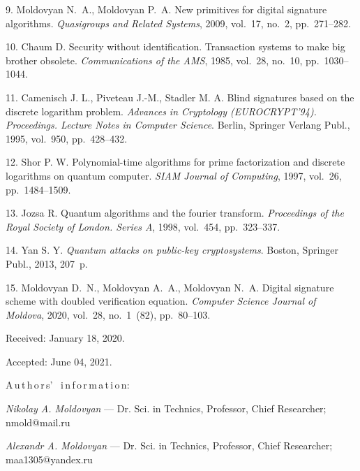 {%
9.\,\,Moldovyan N.~A., Moldovyan P.~A. New primitives for digital signature algorithms. {\it Quasigroups and Related Systems}, 2009, vol.~17, no.~2, pp.~271--282.

10.\,\,Chaum D. Security without identification. Transaction
systems to make big brother obsolete. {\it Communications of the AMS}, 1985, vol.~28, no.~10, pp.~1030--1044.

11.\,\,Camenisch J. L., Piveteau J.-M., Stadler M. A. Blind signatures based on the discrete logarithm problem. {\it Advances in Cryptology (EUROCRYPT'94). Proceedings. Lecture Notes in Computer Science}. Berlin, Springer Verlang Publ., 1995, vol.~950, pp.~428--432.

12.\,\,Shor P. W. Polynomial-time algorithms for prime factorization and discrete logarithms on quantum computer. \textit{SIAM Journal of Computing}, 1997, vol.~26, pp.~1484--1509.

13.\,\,Jozsa R. Quantum algorithms and the fourier transform. \textit{Proceedings of the Royal Society of  London. Series A}, 1998, vol.~454, pp.~323--337.

14.\,\,Yan S. Y. \textit{Quantum attacks on public-key cryptosystems}. Boston, Springer Publ., 2013, 207~p.

15.\,\,Moldovyan D.~N., Moldovyan A.~A., Moldovyan N.~A. Digital signature scheme with doubled verification equation. {\it Computer Science Journal of Moldova}, 2020, vol.~28, no.~1~(82), pp.~80--103.



\vskip 1.5mm

%


Received:  January 18, 2020.

Accepted: June 04, 2021.

\vskip 4.5mm%
A\,u\,t\,h\,o\,r\,s' \ i\,n\,f\,o\,r\,m\,a\,t\,i\,o\,n:

\vskip 2mm \textit{Nikolay A. Moldovyan} ---  Dr. Sci. in Technics, Professor, Chief Researcher; nmold@mail.ru

\vskip 2mm \textit{Alexandr A. Moldovyan} ---  Dr. Sci. in Technics, Professor, Chief Researcher; maa1305@yandex.ru \par%
%
%
}
